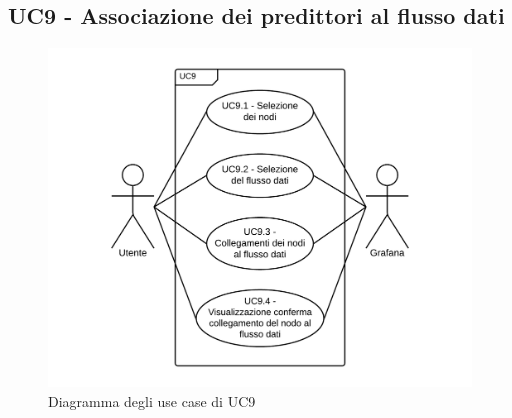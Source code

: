 \subsection{UC9 - Associazione dei predittori al flusso dati}
\begin{figure}[H]
\includegraphics{img/UC9_-_Associazione_dei_nodi_al_flusso_dati.png}
\caption{Diagramma degli use case di UC9}
\end{figure}
